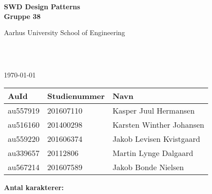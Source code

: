 \begin{center}
	{\fontsize{36pt}{0}\selectfont
		\textbf{
		SWD Design Patterns\\
		Gruppe 38\\
		}
	}
	\vspace{20pt}

	{\fontsize{14pt}{0}\selectfont
		Aarhus University School of Engineering\\
	}
	\vspace{20pt}

	{\fontsize{24pt}{0}\selectfont
		\thetitle\\
	}
	\vspace{20pt}

	{\fontsize{18pt}{0}\selectfont
		\ifdefined\frontpageDate
			\frontpageDate\\
		\else
			\today\\
		\fi
	}
	\vspace{20pt}

	\vspace{5pt}
	\begin{tabular}{|l|l|l|}
		\hline
		\rowcolor{gray!50}
		\textbf{AuId} &	\textbf{Studienummer} & \textbf{Navn}\\ [5px]
		\hline
		au557919 & 201607110 & Kasper Juul Hermansen \\
		\hline
		au516160 & 201400298 & Karsten Winther Johansen \\
		\hline
		au559220 & 201606374 & Jakob Levisen Kvistgaard \\
		\hline
		au339657 & 20112806 & Martin Lynge Dalgaard \\
		\hline
		au567214 & 201607589 & Jakob Bonde Nielsen \\
		\hline
	\end{tabular}

	\ifdefined\frontpageCharacters
		\vspace{10pt}
		\textbf{Antal karakterer: } \frontpageCharacters\\
	\fi
	\vspace{30pt}

\end{center}
